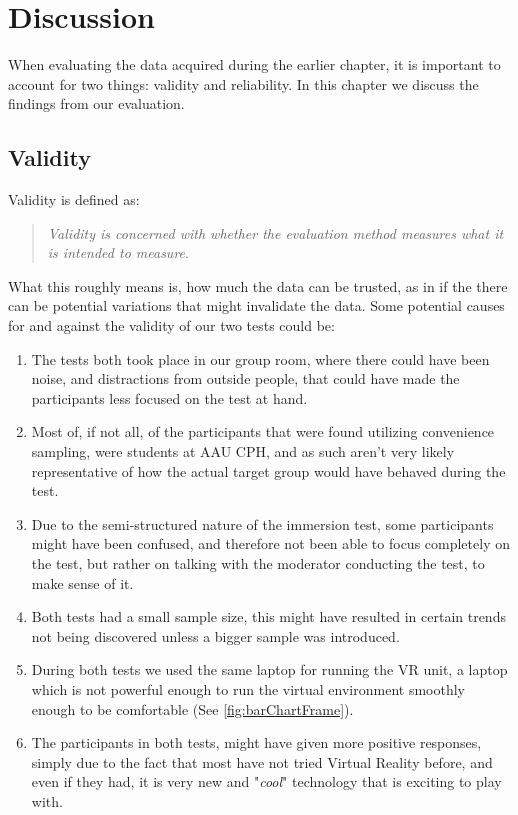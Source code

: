 \chapter{Discussion}
When evaluating the data acquired during the earlier chapter, it is important to account for two things: validity and reliability. In this chapter we discuss the findings from our evaluation.
\section*{Validity}
	Validity is defined as:\\
	\begin{quote}
		\textit{Validity is concerned with whether the evaluation method measures what it is intended to measure}\cite{interactionDesign}.\\
	\end{quote}
	What this roughly means is, how much the data can be trusted, as in if the there can be potential variations that might invalidate the data. Some potential causes for and against the validity of our two tests could be:\\
	\begin{enumerate}
		\item The tests both took place in our group room, where there could have been noise, and distractions from outside people, that could have made the participants less focused on the test at hand.\\
		
		\item Most of, if not all, of the participants that were found utilizing convenience sampling, were students at AAU CPH, and as such aren't very likely representative of how the actual target group would have behaved during the test.\\
		
		\item Due to the semi-structured nature of the immersion test, some participants might have been confused, and therefore not been able to focus completely on the test, but rather on talking with the moderator conducting the test, to make sense of it.\\
		
		\item Both tests had a small sample size, this might have resulted in certain trends not being discovered unless a bigger sample was introduced.\\
		
		\item During both tests we used the same laptop for running the VR unit, a laptop which is not powerful enough to run the virtual environment smoothly enough to be comfortable (See \autoref{fig:barChartFrame}).\\
		
		\item The participants in both tests, might have given more positive responses, simply due to the fact that most have not tried Virtual Reality before, and even if they had, it is very new and "\textit{cool}" technology that is exciting to play with.
		
	\end{enumerate}


